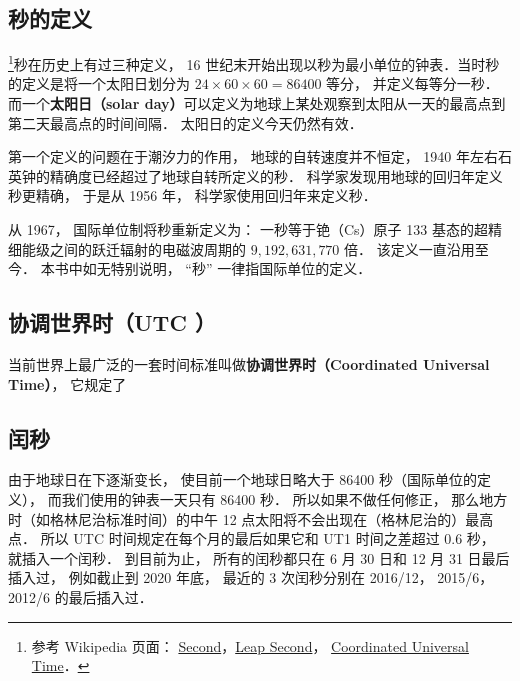 
\subsection{秒的定义}
\footnote{参考 Wikipedia 页面： \href{https://en.wikipedia.org/wiki/Second}{Second}，\href{https://en.wikipedia.org/wiki/Leap_second}{Leap Second}， \href{https://en.wikipedia.org/wiki/Coordinated_Universal_Time}{Coordinated Universal Time}．}秒在历史上有过三种定义， 16 世纪末开始出现以秒为最小单位的钟表．当时秒的定义是将一个太阳日划分为 $24\times60\times60 = 86400$ 等分， 并定义每等分一秒． 而一个\textbf{太阳日（solar day）}可以定义为地球上某处观察到太阳从一天的最高点到第二天最高点的时间间隔． 太阳日的定义今天仍然有效．

第一个定义的问题在于潮汐力的作用， 地球的自转速度并不恒定， 1940 年左右石英钟的精确度已经超过了地球自转所定义的秒． 科学家发现用地球的回归年定义秒更精确， 于是从 1956 年， 科学家使用回归年来定义秒．

从 1967， 国际单位制将秒重新定义为： 一秒等于铯（Cs）原子 133 基态的超精细能级之间的跃迁辐射的电磁波周期的 $9,192,631,770$ 倍． 该定义一直沿用至今． 本书中如无特别说明， “秒” 一律指国际单位的定义．

\subsection{协调世界时（UTC ）}
当前世界上最广泛的一套时间标准叫做\textbf{协调世界时（Coordinated Universal Time）}， 它规定了

\subsection{闰秒}
由于地球日在下逐渐变长， 使目前一个地球日略大于 86400 秒（国际单位的定义）， 而我们使用的钟表一天只有 86400 秒． 所以如果不做任何修正， 那么地方时（如格林尼治标准时间）的中午 12 点太阳将不会出现在（格林尼治的）最高点． 所以 UTC 时间规定在每个月的最后如果它和 UT1 时间之差超过 0.6 秒， 就插入一个闰秒． 到目前为止， 所有的闰秒都只在 6 月 30 日和 12 月 31 日最后插入过， 例如截止到 2020 年底， 最近的 3 次闰秒分别在 2016/12， 2015/6， 2012/6 的最后插入过．
